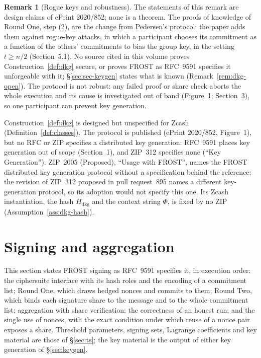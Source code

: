\documentclass[11pt,a4paper]{article}
\theoremstyle{definition}
\newtheorem{remark}[theorem]{Remark}
\begin{document}
\begin{remark}[Rogue keys and robustness]\label{rem:dkg-design}
The statements of this remark are design claims of ePrint 2020/852; none is
a theorem. The proofs of knowledge of Round One, step (2), are the change
from Pedersen's protocol: the paper adds them against rogue-key attacks, in
which a participant chooses its commitment as a function of the others'
commitments to bias the group key, in the setting \(t \ge n/2\)
(Section~5.1). No source cited in this volume proves
Construction~\ref{def:dkg} secure, or proves FROST as RFC~9591 specifies it
unforgeable with it; \S\ref{sec:sec-keygen} states what is known
(Remark~\ref{rem:dkg-open}). The protocol is not robust: any failed proof or
share check aborts the whole execution and its cause is investigated out of
band (Figure~1; Section~3), so one participant can prevent key generation.
\end{remark}

Construction~\ref{def:dkg} is designed but unspecified for Zcash
(Definition~\ref{def:classes}). The protocol is published (ePrint 2020/852,
Figure~1), but no RFC or ZIP specifies a distributed key generation:
RFC~9591 places key generation out of scope (Section~1), and ZIP~312
specifies none (``Key Generation''). ZIP~2005 (Proposed), ``Usage with
FROST'', names the FROST distributed key generation protocol without a
specification behind the reference; the revision of ZIP~312 proposed in pull
request~895 names a different key-generation protocol, so its adoption would not
specify this
one. Its Zcash instantiation, the hash \(H_{\mathrm{dkg}}\) and the context
string \(\Phi\), is fixed by no ZIP (Assumption~\ref{ass:dkg-hash}).

\section{Signing and aggregation}\label{sec:sign}

This section states FROST signing as RFC~9591 specifies it, in execution
order: the ciphersuite interface with its hash roles and the encoding of a
commitment list; Round One, which draws hedged nonces and commits to them;
Round Two, which binds each signature share to the message and to the whole
commitment list; aggregation with share verification; the correctness of an
honest run; and the single use of nonces, with the exact condition under
which reuse of a nonce pair exposes a share. Threshold parameters, signing
sets, Lagrange coefficients and key material are those of \S\ref{sec:ts};
the key material is the output of either key generation of
\S\ref{sec:keygen}.
\end{document}
